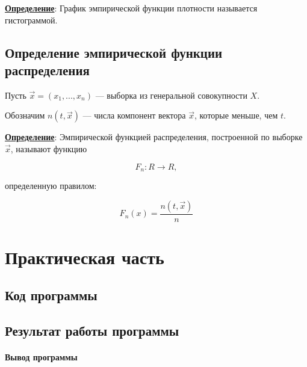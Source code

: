 \textbf{\underline{Определение}}: График эмпирической функции плотности называется гистограммой.


\section{Определение эмпирической функции распределения}

Пусть $\vec x = (x_1, ..., x_n)$ --- выборка из генеральной совокупности $X$.

Обозначим $n(t, \vec x)$ --- числа компонент вектора $\vec x$, которые меньше, чем $t$.\newline

\textbf{\underline{Определение}}: Эмпирической функцией распределения, построенной по выборке $\vec x$, называют функцию

\begin{equation}
    F_n: {R} \to {R},
\end{equation}

определенную правилом:

\begin{equation}
    F_n(x) = \frac{n(t, \vec x)}{n}
\end{equation}



\chapter{Практическая часть}

\section{Код программы}




\section{Результат работы программы}

\subsubsection{Вывод программы}

